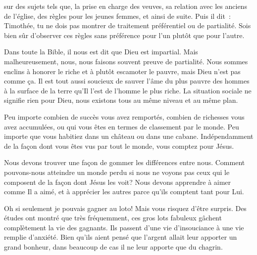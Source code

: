  sur des sujets tels que, la prise en charge des veuves,
 sa relation avec les anciens de l'église, des règles pour les jeunes femmes,
 et ainsi de suite. Puis il dit~: 
 \og Timothée, 
 tu ne dois pas montrer de traitement préférentiel ou de partialité.
 Sois bien sûr d'observer ces règles sans préférence pour l'un plutôt
 que pour l'autre. \fg{}

Dans toute la Bible, il nous est dit que Dieu est impartial.
 Mais malheureusement, nous, nous faisons souvent preuve de partialité.
 Nous sommes enclins à honorer le riche et à plutôt escamoter le pauvre,
 mais Dieu n'est pas comme ça. Il est tout aussi soucieux de sauver l'âme
 du plus pauvre des hommes à la surface de la terre qu'Il l'est de l'homme
 le plus riche. La situation sociale ne signifie rien pour Dieu,
 nous existons tous au même niveau et au même plan. 


Peu importe combien de succès vous avez remportés, combien de richesses
 vous avez accumulées, ou qui vous êtes en termes de classement par le monde.
 Peu importe que vous habitiez dans un château ou dans une cabane.
 Indépendamment de la façon dont vous êtes vus par tout le monde,
 vous comptez pour Jésus. 

Nous devons trouver une façon de gommer les différences entre nous.
 Comment pouvons-nous atteindre un monde perdu si nous ne voyons pas
 ceux qui le composent de la façon dont Jésus les voit?
 Nous devons apprendre à aimer comme Il a aimé, et à apprécier les autres
 parce qu'ils comptent tant pour Lui.

\dvrule







 
 \og Oh si seulement je pouvais gagner au loto! \fg{}
 Mais vous risquez d'être surpris. Des études ont montré
 que très fréquemment, ces gros lots fabuleux gâchent complètement
 la vie des gagnants. Ils passent d'une vie d'insouciance
 à une vie remplie d'anxiété. Bien qu'ils aient pensé
 que l'argent allait leur apporter un grand bonheur,
 dans beaucoup de cas il ne leur apporte que du chagrin.

